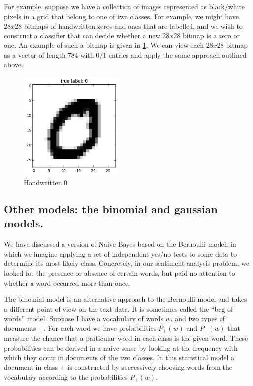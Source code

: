 \documentclass[
]{article}
\begin{document}
For example, suppose we have a collection of images represented as
black/white pixels in a grid that belong to one of two classes. For
example, we might have \(28x28\) bitmaps of handwritten zeros and ones
that are labelled, and we wish to construct a classifier that can decide
whether a new \(28x28\) bitmap is a zero or one. An example of such a
bitmap is given in \cref{fig:mnist0}. We can view each \(28x28\) bitmap
as a vector of length \(784\) with \(0/1\) entries and apply the same
approach outlined above.

\begin{figure}
\hypertarget{fig:mnist0}{%
\centering
\includegraphics[width=2in,height=\textheight]{../img/mnist_data_10_0.png}
\caption{Handwritten 0}\label{fig:mnist0}
}
\end{figure}

\hypertarget{other-models-the-binomial-and-gaussian-models.}{%
\subsection{Other models: the binomial and gaussian
models.}\label{other-models-the-binomial-and-gaussian-models.}}

We have discussed a version of Naive Bayes based on the Bernoulli model,
in which we imagine applying a set of independent yes/no tests to some
data to determine its most likely class. Concretely, in our sentiment
analysis problem, we looked for the presence or absence of certain
words, but paid no attention to whether a word occurred more than once.

The binomial model is an alternative approach to the Bernoulli model and
takes a different point of view on the text data. It is sometimes called
the ``bag of words'' model. Suppose I have a vocabulary of words \(w\),
and two types of documents \(\pm\). For each word we have probabilities
\(P_{+}(w)\) and \(P_{-}(w)\) that measure the chance that a particular
word in each class is the given word. These probabilities can be derived
in a naive sense by looking at the frequency with which they occur in
documents of the two classes. In this statistical model a document in
class \(+\) is constructed by successively choosing words from the
vocabulary according to the probabilities \(P_{+}(w)\).
\end{document}

